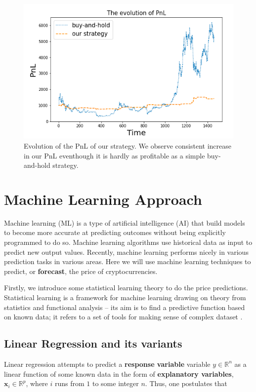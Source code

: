 \documentclass[twoside]{report}
\begin{document}
\begin{spacing}{1}
\begin{figure}[!htbp]
    \centering
    \includegraphics[width=0.8\linewidth]{Causality_between_time_series/backtested_strategy_2.png}
    \caption{Evolution of the PnL of our strategy. We observe consistent increase in our PnL eventhough it is hardly as profitable as a simple buy-and-hold strategy.}
    \label{fig:backtested_strategy_2}
\end{figure}



\section{Machine Learning Approach}
Machine learning (ML) is a type of artificial intelligence (AI) that build models to become more accurate at predicting outcomes without being explicitly programmed to do so. Machine learning algorithms use historical data as input to predict new output values. Recently, machine learning performs nicely in various prediction tasks in various areas. Here we will use machine learning techniques to predict, or \textbf{forecast}, the price of cryptocurrencies.

Firstly, we introduce some statistical learning theory to do the price predictions. Statistical learning is a framework for machine learning drawing on theory from statistics and functional analysis -- its aim is to find a predictive function based on known data; it refers to a set of tools for making sense of complex dataset \cite{james2013introduction}.  











\subsection{Linear Regression and its variants}
Linear regression attempts to predict a \textbf{response variable} variable $y \in \mathbb{R}^n$ as a linear function of some known data in the form of \textbf{explanatory variables}, $\boldsymbol{x}_i \in \mathbb{R}^p$, where $i$ runs from $1$ to some integer $n$. Thus, one postulates that


\end{spacing}
\end{document}

